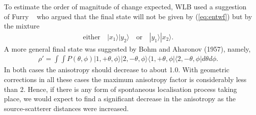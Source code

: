 \documentclass[12pt]{article}
\begin{document}
To estimate the order of magnitude of change expected, WLB used a suggestion of Furry ~\cite{wf36} who argued that the final state will not be given by (\ref{eq:entwf}) but by the mixture 
\begin{eqnarray}
\mbox{either}\quad                                                                                                                                                                                                                                                                                                                                                                                                                                                                                                                                                                                                                                                                                                                                                                                                                                                                                                                                                                                                                                                                                                                                                                                                                                                                                                                                                                                                                                                                                                                                                                                                                                                                                                                                                                         |x_1\rangle|y_2\rangle\quad\mbox{or}\quad   |y_1\rangle|x_2\rangle.  	\label{eq:simple}
\end{eqnarray}
A more general final state was suggested by Bohm and Aharonov (1957), namely,\cite{dbya57}
\begin{eqnarray}
\rho'=\int\int P(\theta, \phi)|1,+\theta,\phi\rangle|2,-\theta,\phi\rangle\langle1,+\theta,\phi|\langle 2,-\theta,\phi| d\theta d\phi.		\label{eq:mixed}
\end{eqnarray} 	
In both cases the anisotropy should decrease to about 1.0.  With geometric corrections in all these cases the maximum anisotropy factor is considerably less than 2. Hence, if there is any form of spontaneous localisation process taking place, we would expect to find a significant decrease in the anisotropy as the source-scatterer distances were increased. 
\end{document}
